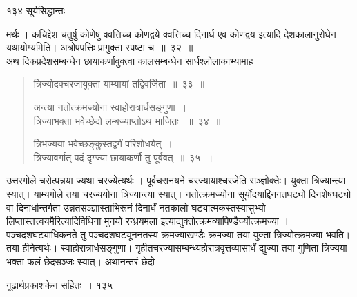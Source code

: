 \documentclass[11pt, openany]{book}
\begin{document}
\newpage


\noindent १३४ \hspace{4cm} सूर्यसिद्धान्तः
\vspace{1cm}

\begin{sloppypar}
\noindent मर्थः । कचिद्देश चतुर्षु कोणेषु क्वत्तिच्च कोणद्वये क्वत्तिच्च दिनार्ध एव कोणद्वय इत्यादि देशकालानुरोधेन यथायोग्यमिति। अत्रोपपत्तिः प्रागुक्ता स्पष्टा च~॥~३२~॥\\
अथ दिकप्रदेशसम्बन्धेन छायाकर्णावुक्त्वा कालसम्बन्धेन सार्धश्लोलाकाभ्यामाह\textendash
\end{sloppypar}


\begin{quote}
{\ssi त्रिज्योदक्चरजायुक्ता याम्यायां तद्विवर्जिता~॥~३३~॥

अन्त्या नतोत्क्रमज्योना स्वाहोरात्रार्धसङ्गुणा~।\\
त्रिज्याभक्ता भवेच्छेदो लम्बज्याप्तोऽथ भाजितः ~॥~३४~॥

त्रिभज्यया भवेच्छङ्कुस्तद्वर्गं परिशोधयेत्~।\\
त्रिज्यावर्गात् पदं दृग्ज्या छायाकर्णौ तु पूर्ववत्~॥~३५~॥}
\end{quote}

\begin{sloppypar}
उत्तरगोले चरोत्पन्नया ज्यथा चरज्येत्यर्थः । पूर्वचरानयने चरज्यायाश्चरजेति सञ्ज्ञोक्तेः। युक्ता त्रिज्यान्त्या स्यात्। याम्यगोले तया चरज्ययोना त्रिज्यान्त्या स्यात्। नतोत्क्रमज्योना सूर्योदयाद्दिनगतघट्यो दिनशेषघट्यो वा दिनार्धान्तर्गता उन्नतसञ्ज्ञास्ताभिरूनं दिनार्धं नतकालो घट्यात्मकस्तस्यासुभ्यो लिप्तास्तत्त्वयमैरित्यादिविधिना मुनयो रन्ध्रयमला इत्याद्युक्तोत्क्रमव्यापिण्डैर्ज्योत्क्रमज्या । पञ्चदशघट्याधिकनते तु पञ्चदशघट्यूननतस्य क्रमज्याखण्डैः क्रमज्या तया युक्ता त्रिज्योत्क्रमज्या भवति। तया हीनेत्यर्थः। स्वाहोरात्रार्धसङ्गुणा। गृहीतचरज्यासम्बन्ध्यहोरात्रवृत्तव्यासार्धं द्युज्या तया गुणिता त्रिज्यया भक्ता फलं छेदसञ्जः स्यात्। अथानन्तरं छेदो
\end{sloppypar}




\newpage

\hspace{3cm} गूढार्थप्रकाशकेन सहितः~। \hfill १३५
\vspace{1cm}
\end{document}
